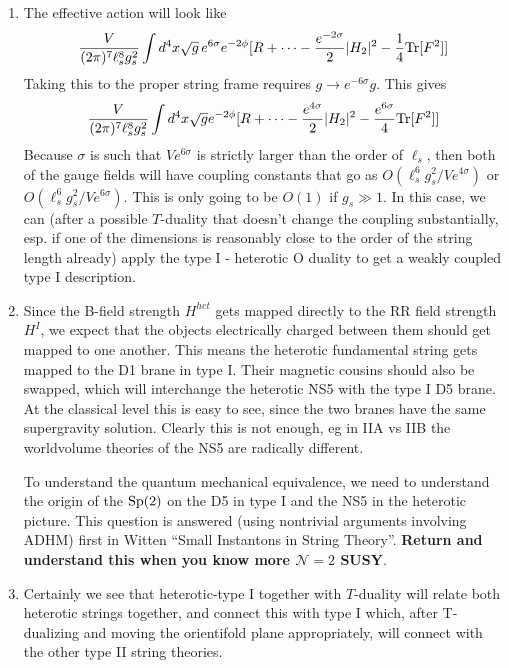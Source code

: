 \documentclass[11pt, class=article, crop=false]{standalone}
\begin{document}
\begin{enumerate}
	At the level of the supergravity theory, we have $g^I = e^{-\Phi^{het}} g^{het}$ is a symmetry of the theory. Then the string length scales must obey
	\[
		\ell^I_s = \ell^{het}_s \sqrt{g^{het}_s} \Rightarrow M^I_s = \frac{M^{het}_s}{\sqrt{g^{het}_s}}
	\] 
	
	\item The effective action will look like
	\[
		\frac{V}{(2\pi)^7 \ell_s^8 g_s^2} \int d^4 x \sqrt{g}\, e^{6 \sigma} e^{-2\phi} [R + \dots - \frac{e^{-2 \sigma}}{2} |H_2|^2 - \frac{1}{4} \mathrm{Tr}[F^2]]
	\]
	Taking this to the proper string frame requires $g \to e^{-6\sigma} g$. This gives 
	\[
		\frac{V}{(2\pi)^7 \ell_s^8 g_s^2}\int d^4 x \sqrt{g} e^{-2\phi} [R + \dots - \frac{e^{4 \sigma}}{2} |H_2|^2 - \frac{e^{6 \sigma}}{4} \mathrm{Tr}[F^2]]
	\]
	Because $\sigma$ is such that $V e^{6 \sigma}$ is strictly larger than the order of $\ell_s$, then both of the gauge fields will have coupling constants that go as $O(\ell_s^6 g_s^2/V e^{4 \sigma})$ or $O(\ell_s^6 g_s^2/V e^{6 \sigma})$. This is only going to be $O(1)$ if $g_s \gg 1$. In this case, we can (after a possible $T$-duality that doesn't change the coupling substantially, esp. if one of the dimensions is reasonably close to the order of the string length already) apply the type I - heterotic O duality to get a weakly coupled type I description. 

	\item Since the B-field strength $H^{het}$ gets mapped directly to the RR field strength $H^{I}$, we expect that the objects electrically charged between them should get mapped to one another. This means the heterotic fundamental string gets mapped to the D1 brane in type I. Their magnetic cousins should also be swapped, which will interchange the heterotic NS5 with the type I D5 brane. 
	At the classical level this is easy to see, since the two branes have the same supergravity solution. Clearly this is not enough, eg in IIA vs IIB the worldvolume theories of the NS5 are radically different.
	
	 To understand the quantum mechanical equivalence, we need to understand the origin of the $\mathrm{Sp}(2)$ on the D5 in type I and the NS5 in the heterotic picture. This question is answered (using nontrivial arguments involving ADHM) first in Witten ``Small Instantons in String Theory''. \textbf{Return and understand this when you know more $\mathcal N =2$ SUSY}.
	
	
	
	\item Certainly we see that heterotic-type I together with $T$-duality will relate both heterotic strings together, and connect this with type I which, after T-dualizing and moving the orientifold plane appropriately, will connect with the other type II string theories. 
	

\end{enumerate}
\end{document}
